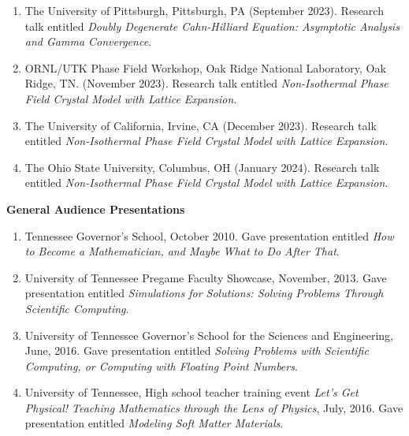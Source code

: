 \documentclass[11pt]{letter}
\begin{document}
\begin{enumerate}
	\item
The University of Pittsburgh, Pittsburgh, PA (September 2023).  Research talk entitled {\sl Doubly Degenerate Cahn-Hilliard Equation: Asymptotic Analysis and Gamma Convergence}.

	\item
ORNL/UTK Phase Field Workshop, Oak Ridge National Laboratory, Oak Ridge, TN. (November 2023).  Research talk entitled {\sl Non-Isothermal Phase Field Crystal Model with Lattice Expansion}.

	\item
The University of California, Irvine, CA (December 2023).  Research talk entitled {\sl Non-Isothermal Phase Field Crystal Model with Lattice Expansion}.

	\item
The Ohio State University, Columbus, OH (January 2024).  Research talk entitled {\sl Non-Isothermal Phase Field Crystal Model with Lattice Expansion}.

	\end{enumerate}

	\smallskip

{\LARGE\bf General Audience Presentations}

    \begin{enumerate}
    \item
Tennessee Governor's School, October 2010. Gave presentation entitled {\sl How to Become a Mathematician, and Maybe What to Do After That}.
    
    \item
University of Tennessee Pregame Faculty Showcase, November, 2013. Gave presentation entitled {\sl Simulations for Solutions: Solving Problems Through Scientific Computing}.
    
    \item
University of Tennessee Governor's School for the Sciences and Engineering, June, 2016. Gave presentation entitled {\sl Solving Problems with Scientific Computing, or Computing with Floating Point Numbers}.

	\item
University of Tennessee, High school teacher training event {\sl Let's Get Physical! Teaching Mathematics through the Lens of Physics}, July, 2016. Gave presentation entitled {\sl  Modeling Soft Matter Materials}.

	\end{enumerate}
	
	\smallskip
	
\end{document}
